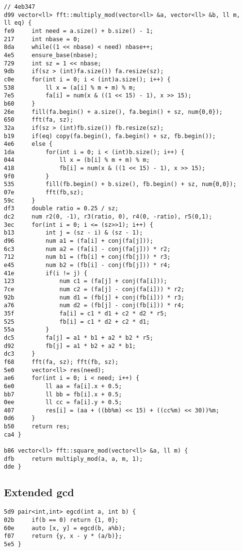 \documentclass[11pt, a4paper, twoside]{article}
\begin{document}
\begin{lstlisting}
// 4eb347
d99 vector<ll> fft::multiply_mod(vector<ll> &a, vector<ll> &b, ll m, ll eq) {
fe9     int need = a.size() + b.size() - 1;
217     int nbase = 0;
8da     while((1 << nbase) < need) nbase++;
4e5     ensure_base(nbase);
729     int sz = 1 << nbase;
9db     if(sz > (int)fa.size()) fa.resize(sz);
c0e     for(int i = 0; i < (int)a.size(); i++) {
538         ll x = (a[i] % m + m) % m;
7e5         fa[i] = num(x & ((1 << 15) - 1), x >> 15);
b60     }
26e     fill(fa.begin() + a.size(), fa.begin() + sz, num{0,0});
650     fft(fa, sz);
32a     if(sz > (int)fb.size()) fb.resize(sz);
b19     if(eq) copy(fa.begin(), fa.begin() + sz, fb.begin());
4e6     else {
1da         for(int i = 0; i < (int)b.size(); i++) {
044             ll x = (b[i] % m + m) % m;
418             fb[i] = num(x & ((1 << 15) - 1), x >> 15);
9f0         }
535         fill(fb.begin() + b.size(), fb.begin() + sz, num{0,0});
07e         fft(fb,sz);
59c     }
df3     double ratio = 0.25 / sz;
dc2     num r2(0, -1), r3(ratio, 0), r4(0, -ratio), r5(0,1);
3ec     for(int i = 0; i <= (sz>>1); i++) {
b13         int j = (sz - i) & (sz - 1);
d96         num a1 = (fa[i] + conj(fa[j]));
6c3         num a2 = (fa[i] - conj(fa[j])) * r2;
712         num b1 = (fb[i] + conj(fb[j])) * r3;
e45         num b2 = (fb[i] - conj(fb[j])) * r4;
41e         if(i != j) {
123             num c1 = (fa[j] + conj(fa[i]));
7ce             num c2 = (fa[j] - conj(fa[i])) * r2;
92b             num d1 = (fb[j] + conj(fb[i])) * r3;
a76             num d2 = (fb[j] - conj(fb[i])) * r4;
35f             fa[i] = c1 * d1 + c2 * d2 * r5;
525             fb[i] = c1 * d2 + c2 * d1;
55a         }
dc5         fa[j] = a1 * b1 + a2 * b2 * r5;
d92         fb[j] = a1 * b2 + a2 * b1;
dc3     }
f68     fft(fa, sz); fft(fb, sz);
5e0     vector<ll> res(need);
ae6     for(int i = 0; i < need; i++) {
6e0         ll aa = fa[i].x + 0.5;
bb7         ll bb = fb[i].x + 0.5;
0ee         ll cc = fa[i].y + 0.5;
407         res[i] = (aa + ((bb%m) << 15) + ((cc%m) << 30))%m;
0d6     }
b50     return res;
ca4 }

b86 vector<ll> fft::square_mod(vector<ll> &a, ll m) {
dfb     return multiply_mod(a, a, m, 1);
dde }
\end{lstlisting}

\subsection{Extended gcd}
\begin{lstlisting}
5d9 pair<int,int> egcd(int a, int b) {
02b 	if(b == 0) return {1, 0};
60e 	auto [x, y] = egcd(b, a%b);
f07 	return {y, x - y * (a/b)};
5e5 }
\end{lstlisting}
\end{document}
